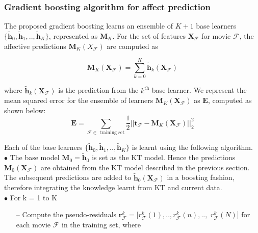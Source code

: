 \documentclass{article}
\begin{document}
\begin{spacing}{0.9}
\vspace{-2mm}
\subsubsection{Gradient boosting algorithm for affect prediction}
\vspace{-2mm}
The proposed gradient boosting learns an ensemble of $K+1$ base learners $\{\tilde{\bm h}_0, \tilde{\bm h}_1, .., \tilde{\bm h}_K\}$, represented as $\bm M_K$. 
For the set of features ${\bm X}_{\mathcal F}$ for movie $\mathcal F$, the affective predictions $\bm M_K(X_{\mathcal F})$ are computed as  

\begin{equation}
\bm M_K(\bm X_{\mathcal F}) = \sum_{k=0}^K \tilde{\bm h}_k(\bm X_\mathcal F)
\end{equation}

where $\tilde{\bm h}_k(\bm X_\mathcal F)$ is the prediction from the $k^\text{th}$ base learner.
We represent the mean squared error for the ensemble of learners $\bm M_K(\bm X_\mathcal F)$ as $\bm E$, computed as shown below: 
\begin{equation}
\bm E = \sum_\text{$\mathcal F \in$ training set} \frac{1}{2}||\bm t_\mathcal F - \bm M_K(\bm X_\mathcal F)||_2^2 
\end{equation}

Each of the base learners $\{\tilde{\bm h}_0, \tilde{\bm h}_1, .., \tilde{\bm h}_K\}$ is learnt using the following algorithm.
\\

\noindent$\bullet$ The base model $\bm M_0 = \tilde{\bm h}_0$ is set as the KT model. 
Hence the predictions $\bm M_0(\bm X_\mathcal F)$ are obtained from the KT model described in the previous section. 
The subsequent predictions are added to $\tilde{\bm h}_0(\bm X_\mathcal F)$ in a boosting fashion, therefore integrating the knowledge learnt from KT and current data.\\ 

\noindent $\bullet$ For k = 1 to K 

\begin{itemize}
\item[--] Compute the pseudo-residuals ${\bm r}_{\mathcal F}^k = [r^k_\mathcal F(1), .., r^k_\mathcal F(n), .., $ $r^k_\mathcal F(N)]$ for each movie $\mathcal F$ in the training set, where	


\end{itemize}
\end{spacing}
\end{document}
